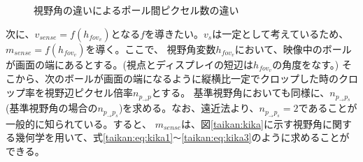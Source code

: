 \begin{figure}[h]
  \begin{center}
  \caption{視野角の違いによるポール間ピクセル数の違い}
  \label{taikan:px}
  \end{center}
\end{figure}

次に、$v_{sense}=f(h_{fov_v})$となる$f$を導きたい。$v_s$は一定として考えているため、$m_{sense}=f(h_{fov_v})$を導く。ここで、
視野角変数$h_{fov_v}$において、映像中のボールが画面の端にあるとする。(視点とディスプレイの短辺は$h_{fov_v}$の角度をなす。)
そこから、次のボールが画面の端になるように縦横比一定でクロップした時のクロップ率を視野辺ピクセル倍率$n_{p_{\to}p}$とする。
基準視野角においても同様に、$n_{p_{\to}p_s}$(基準視野角の場合の$n_{p_{\to}p_s}$)を求める。なお、遠近法より、$n_{p_{\to}p_s} = 2$であることが一般的に知られている。すると、
$m_{sense}$は、図\ref{taikan:kika}に示す視野角に関する幾何学を用いて、式\eqref{taikan:eq:kika1}\verb|～|\eqref{taikan:eq:kika3}のように求めることができる。

